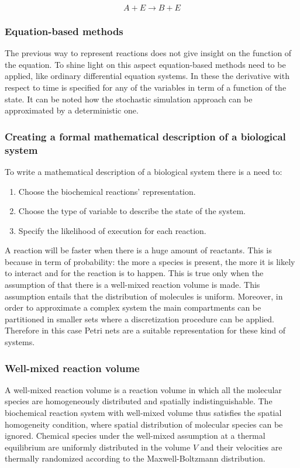         $$A+E\rightarrow B+E$$

    \subsubsection{Equation-based methods}
    The previous way to represent reactions does not give insight on the function of the equation.
    To shine light on this aspect equation-based methods need to be applied, like ordinary differential equation systems.
    In these the derivative with respect to time is specified for any of the variables in term of a function of the state.
    It can be noted how the stochastic simulation approach can be approximated by a deterministic one.

    \subsubsection{Creating a formal mathematical description of a biological system}
    To write a mathematical description of a biological system there is a need to:

    \begin{enumerate}
      \item Choose the biochemical reactions' representation.
      \item Choose the type of variable to describe the state of the system.
      \item Specify the likelihood of execution for each reaction.
    \end{enumerate}

    A reaction will be faster when there is a huge amount of reactants.
    This is because in term of probability: the more a species is present, the more it is likely to interact and for the reaction is to happen.
    This is true only when the assumption of that there is a well-mixed reaction volume is made.
    This assumption entails that the distribution of molecules is uniform.
    Moreover, in order to approximate a complex system the main compartments can be partitioned in smaller sets where a discretization procedure can be applied.
    Therefore in this case Petri nets are a suitable representation for these kind of systems.

    \subsubsection{Well-mixed reaction volume}
    A well-mixed reaction volume is a reaction volume in which all the molecular species are homogeneously distributed and spatially indistinguishable.
    The biochemical reaction system with well-mixed volume thus satisfies the spatial homogeneity condition, where spatial distribution of molecular species can be ignored.
    Chemical species under the well-mixed assumption at a thermal equilibrium are uniformly distributed in the volume $V$ and their velocities are thermally randomized according to the Maxwell-Boltzmann distribution.

